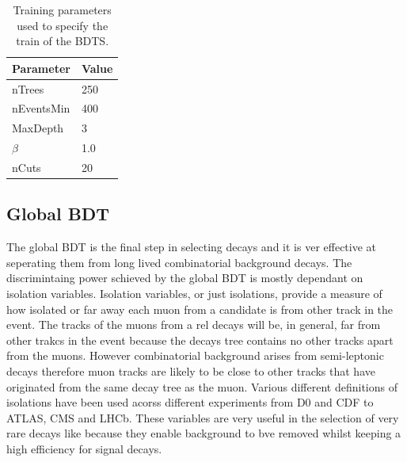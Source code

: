 \begin{table}[htbp]
\begin{center}
\begin{tabular}{ll}
\hline
Parameter & Value \\ \hline
nTrees & 250 \\
nEventsMin & 400 \\
MaxDepth & 3 \\
$\beta$ & 1.0 \\
nCuts & 20 \\
\hline
\end{tabular}
\vspace{0.7cm}
\caption{Training parameters used to specify the train of the BDTS.}
\label{tab:BDTStrainingparams}
\end{center}
\end{table}

\subsection{Global BDT}
\label{sec:globalBDT}

The global BDT is the final step in selecting \bsmumu decays and it is ver effective at seperating them from long lived combinatorial background decays. The discrimintaing power schieved by the global BDT is mostly dependant on isolation variables. Isolation variables, or just isolations, provide a measure of how isolated or far away each muon from a \bsmumu candidate is from other track in the event. The tracks of the muons from a rel \bsmumu decays will be, in general, far from other trakcs in the event because the \bsmumu decays tree contains no other tracks apart from the muons. However combinatorial background arises from semi-leptonic decays therefore muon tracks are likely to be close to other tracks that have originated from the same decay tree as the muon. Various different definitions of isolations have been used acorss different experiments from D0 and CDF to ATLAS, CMS and LHCb. These variables are very useful in the selection of very rare decays like \bsmumu because they enable background to bve removed whilst keeping a high efficiency for signal decays.

